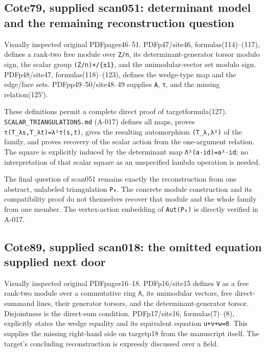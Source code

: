 \documentclass[
  10pt,
]{article}
\begin{document}
\subsection{Cote79, supplied scan051: determinant model and the
remaining reconstruction
question}\label{cote79-supplied-scan051-determinant-model-and-the-remaining-reconstruction-question}

Visually inspected original PDFpages46--51. PDFp47/site46,
formulas(114)--(117), defines a rank-two free module over
\texttt{\small Z/\allowbreak{}n}, its determinant-generator torsor
modulo sign, the scalar group
\texttt{\small (\allowbreak{}Z/\allowbreak{}n)\allowbreak{}×/\allowbreak{}\{±1\}},
and the unimodular-vector set modulo sign. PDFp48/site47,
formulas(118)--(123), defines the wedge-type map and the edge/face sets.
PDFpp49--50/site48--49 supplies \texttt{\small A}, \texttt{\small τ},
and the missing relation(125′).

These definitions permit a complete direct proof of targetformula(127).
\texttt{\small SCALAR\_\allowbreak{}TRIANGULATIONS.md} (A-017) defines
all maps, proves
\texttt{\small τ(\allowbreak{}T\_\allowbreak{}λs,\allowbreak{}T\_\allowbreak{}λt)\allowbreak{}=\allowbreak{}λ²τ(\allowbreak{}s,\allowbreak{}t)\allowbreak{}},
gives the resulting automorphism
\texttt{\small (\allowbreak{}T\_\allowbreak{}λ,\allowbreak{}λ²)\allowbreak{}}
of the family, and proves recovery of the scalar action from the
one-argument relation. The square is explicitly induced by the
determinant map
\texttt{\small Λ²(\allowbreak{}a·id)\allowbreak{}=\allowbreak{}a²·id};
no interpretation of that scalar square as an unspecified lambda
operation is needed.

The final question of scan051 remains exactly the reconstruction from
one abstract, unlabeled triangulation \texttt{\small P₀}. The concrete
module construction and its compatibility proof do not themselves
recover that module and the whole family from one member. The
vertex-action embedding of
\texttt{\small Aut(\allowbreak{}P₀)\allowbreak{}} is directly verified
in A-017.

\subsection{Cote89, supplied scan018: the omitted equation supplied next
door}\label{cote89-supplied-scan018-the-omitted-equation-supplied-next-door}

Visually inspected original PDFpages16--18. PDFp16/site15 defines
\texttt{\small V} as a free rank-two module over a commutative ring
\texttt{\small Λ}, its unimodular vectors, free direct-summand lines,
their generator torsors, and the determinant-generator torsor.
Disjointness is the direct-sum condition. PDFp17/site16,
formulas(7)--(8), explicitly states the wedge equality and its
equivalent equation
\texttt{\small u+\allowbreak{}v+\allowbreak{}w=\allowbreak{}0}. This
supplies the missing right-hand side on targetp18 from the manuscript
itself. The target's concluding reconstruction is expressly discussed
over a field.
\end{document}
